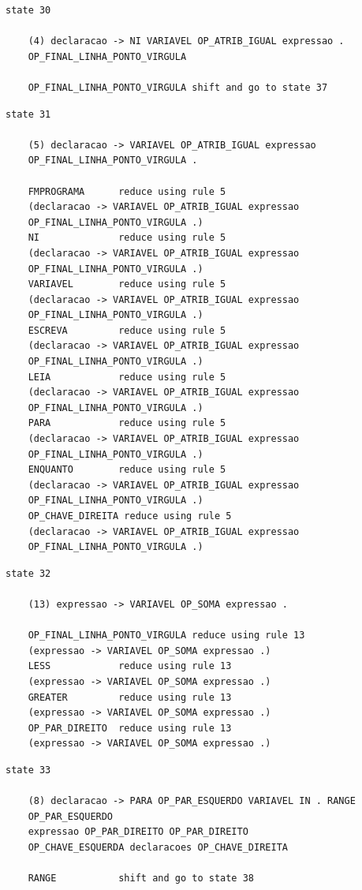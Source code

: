 \documentclass[a4paper,12pt]{article}
\begin{document}
\begin{verbatim}
state 30

    (4) declaracao -> NI VARIAVEL OP_ATRIB_IGUAL expressao . 
    OP_FINAL_LINHA_PONTO_VIRGULA

    OP_FINAL_LINHA_PONTO_VIRGULA shift and go to state 37

\end{verbatim}

\begin{verbatim}
state 31

    (5) declaracao -> VARIAVEL OP_ATRIB_IGUAL expressao 
    OP_FINAL_LINHA_PONTO_VIRGULA .

    FMPROGRAMA      reduce using rule 5 
    (declaracao -> VARIAVEL OP_ATRIB_IGUAL expressao 
    OP_FINAL_LINHA_PONTO_VIRGULA .)
    NI              reduce using rule 5 
    (declaracao -> VARIAVEL OP_ATRIB_IGUAL expressao 
    OP_FINAL_LINHA_PONTO_VIRGULA .)
    VARIAVEL        reduce using rule 5 
    (declaracao -> VARIAVEL OP_ATRIB_IGUAL expressao 
    OP_FINAL_LINHA_PONTO_VIRGULA .)
    ESCREVA         reduce using rule 5 
    (declaracao -> VARIAVEL OP_ATRIB_IGUAL expressao 
    OP_FINAL_LINHA_PONTO_VIRGULA .)
    LEIA            reduce using rule 5 
    (declaracao -> VARIAVEL OP_ATRIB_IGUAL expressao 
    OP_FINAL_LINHA_PONTO_VIRGULA .)
    PARA            reduce using rule 5 
    (declaracao -> VARIAVEL OP_ATRIB_IGUAL expressao 
    OP_FINAL_LINHA_PONTO_VIRGULA .)
    ENQUANTO        reduce using rule 5 
    (declaracao -> VARIAVEL OP_ATRIB_IGUAL expressao 
    OP_FINAL_LINHA_PONTO_VIRGULA .)
    OP_CHAVE_DIREITA reduce using rule 5 
    (declaracao -> VARIAVEL OP_ATRIB_IGUAL expressao 
    OP_FINAL_LINHA_PONTO_VIRGULA .)

\end{verbatim}

\begin{verbatim}
state 32

    (13) expressao -> VARIAVEL OP_SOMA expressao .

    OP_FINAL_LINHA_PONTO_VIRGULA reduce using rule 13 
    (expressao -> VARIAVEL OP_SOMA expressao .)
    LESS            reduce using rule 13 
    (expressao -> VARIAVEL OP_SOMA expressao .)
    GREATER         reduce using rule 13 
    (expressao -> VARIAVEL OP_SOMA expressao .)
    OP_PAR_DIREITO  reduce using rule 13 
    (expressao -> VARIAVEL OP_SOMA expressao .)

\end{verbatim}

\begin{verbatim}
state 33

    (8) declaracao -> PARA OP_PAR_ESQUERDO VARIAVEL IN . RANGE 
    OP_PAR_ESQUERDO 
    expressao OP_PAR_DIREITO OP_PAR_DIREITO 
    OP_CHAVE_ESQUERDA declaracoes OP_CHAVE_DIREITA

    RANGE           shift and go to state 38

\end{verbatim}
\end{document}
